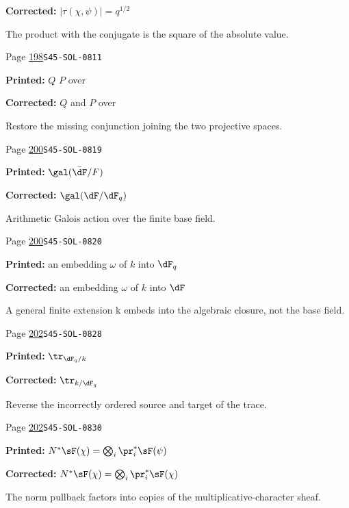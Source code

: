 \begin{description}
\par\noindent\textbf{Corrected:} \(|\tau(\chi,\psi)|=q^{1/2}\)
\par\noindent The product with the conjugate is the square of the absolute value.
\smallskip
\item[\hypertarget{apparatus:EN-0130}{130}] Page \hyperlink{printpage:en:198}{198}\quad\texttt{S45-SOL-0811}
\par\noindent\textbf{Printed:} $Q$ $P$ over
\par\noindent\textbf{Corrected:} $Q$ and $P$ over
\par\noindent Restore the missing conjunction joining the two projective spaces.
\smallskip
\item[\hypertarget{apparatus:EN-0131}{131}] Page \hyperlink{printpage:en:200}{200}\quad\texttt{S45-SOL-0819}
\par\noindent\textbf{Printed:} \(\gal(\bar\dF/F)\)
\par\noindent\textbf{Corrected:} \(\gal(\dF/\dF_q)\)
\par\noindent Arithmetic Galois action over the finite base field.
\smallskip
\item[\hypertarget{apparatus:EN-0132}{132}] Page \hyperlink{printpage:en:200}{200}\quad\texttt{S45-SOL-0820}
\par\noindent\textbf{Printed:} an embedding $\omega$ of $k$ into $\dF_q$
\par\noindent\textbf{Corrected:} an embedding $\omega$ of $k$ into $\dF$
\par\noindent A general finite extension k embeds into the algebraic closure, not the base field.
\smallskip
\item[\hypertarget{apparatus:EN-0133}{133}] Page \hyperlink{printpage:en:202}{202}\quad\texttt{S45-SOL-0828}
\par\noindent\textbf{Printed:} \(\tr_{\dF_q/k}\)
\par\noindent\textbf{Corrected:} \(\tr_{k/\dF_q}\)
\par\noindent Reverse the incorrectly ordered source and target of the trace.
\smallskip
\item[\hypertarget{apparatus:EN-0134}{134}] Page \hyperlink{printpage:en:202}{202}\quad\texttt{S45-SOL-0830}
\par\noindent\textbf{Printed:} \(N^\ast\sF(\chi) = \bigotimes_i \pr_i^\ast\sF(\psi)\)
\par\noindent\textbf{Corrected:} \(N^\ast\sF(\chi) = \bigotimes_i \pr_i^\ast\sF(\chi)\)
\par\noindent The norm pullback factors into copies of the multiplicative-character sheaf.

\end{description}
